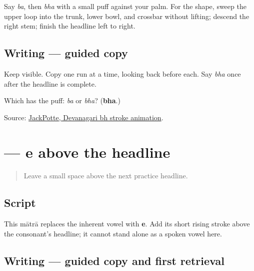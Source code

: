Say \emph{ba}, then \emph{bha} with a small puff against your palm. For the shape, sweep the upper loop into the trunk, lower bowl, and crossbar without lifting; descend the right stem; finish the headline left to right.

\subsection*{Writing — guided copy}

Keep \textbf{} visible. Copy one run at a time, looking back before each. Say \emph{bha} once after the headline is complete.

\begin{tcolorbox}[breakable,colback=teal!4,colframe=teal!35!black,title={Before you move on}]
Which has the puff: \emph{ba} or \emph{bha}? (\textbf{bha}.)

Source: \href{https://commons.wikimedia.org/wiki/File:Devanagari\_b\%CA\%B0\_\%E0\%A4\%AD.gif}{JackPotte, Devanagari bh stroke animation}.
\end{tcolorbox}
\section[\texorpdfstring{\mr{े} (e)}{े (e)}]{ — e above the headline}

\label{lesson:MR-W02-e-matra}



\begin{quote}
Leave a small space above the next practice headline.
\end{quote}

\subsection*{Script}
\begin{quote}
\end{quote}

This mātrā replaces the inherent vowel with \textbf{e}. Add its short rising stroke above the consonant's headline; it cannot stand alone as a spoken vowel here.

\subsection*{Writing — guided copy and first retrieval}

